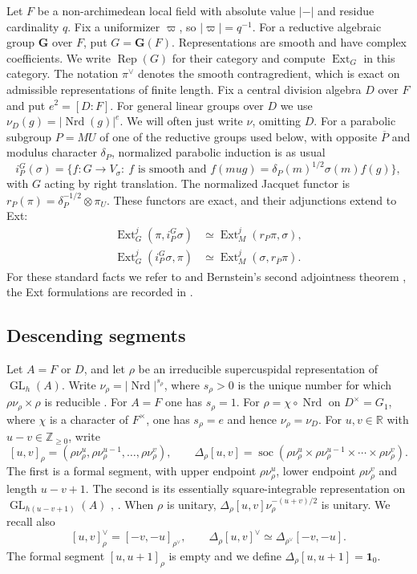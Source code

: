 \documentclass[10pt,a4paper]{article}
\theoremstyle{definition}
\theoremstyle{remark}
\numberwithin{equation}{section}
\newcommand{\ZZ}{\mathbb{Z}}
\newcommand{\rep}{\operatorname{Rep}}
\newcommand{\one}{\mathbf{1}}
\DeclareMathOperator{\Ext}{Ext}
\DeclareMathOperator{\GL}{GL}
\newcommand{\De}{\Delta}
\DeclareMathOperator{\soc}{soc}
\begin{document}
Let $F$ be a non-archimedean local field
with absolute value $|-|$ and residue cardinality $q$. Fix a
uniformizer $\varpi$, so $|\varpi|=q^{-1}$.
For a reductive algebraic group $\mathbf G$ over $F$, put
$G=\mathbf G(F)$. Representations are smooth and have complex
coefficients. We write $\rep(G)$ for their category and compute
$\Ext_G$ in this category. The notation $\pi^\vee$ denotes the smooth
contragredient, which is exact on admissible representations of finite
length.
Fix a central division algebra $D$ over $F$ and put $e^2=[D:F]$.
For general linear groups over $D$ we use
$\nu_D(g)=|\operatorname{Nrd}(g)|^e$.
We will often just write $\nu$, omitting $D$.
For a parabolic subgroup $P=MU$ of one of the reductive groups used
below, with opposite $\overline P$ and modulus character $\delta_P$,
normalized parabolic induction is as usual
\[
 i_P^G(\sigma)
 =\{f:G\longrightarrow V_\sigma:\ f\text{ is smooth and }
 f(mug)=\delta_P(m)^{1/2}\sigma(m)f(g)\},
\]
with $G$ acting by right translation. The normalized Jacquet functor
is $r_P(\pi)=\delta_P^{-1/2}\otimes\pi_U$. These functors are exact,
and their adjunctions extend to Ext:
\begin{align*}
 \Ext_G^j(\pi,i_P^G\sigma)&\simeq\Ext_M^j(r_P\pi,\sigma),\\
 \Ext_G^j(i_P^G\sigma,\pi)&\simeq
       \Ext_M^j(\sigma,r_{\overline P}\pi).
\end{align*}
For these standard facts we refer to \cite{BZ1977} and Bernstein's
second adjointness theorem \cite{Bernstein1987}, the Ext formulations
are recorded in \cite[Lemma~3.2]{APS2017}.

\subsection{Descending segments}\label{prelim:segments}

Let $A=F$ or $D$, and let $\rho$ be an irreducible supercuspidal
representation of $\GL_h(A)$. Write
$\nu_\rho=|\operatorname{Nrd}|^{s_\rho}$, where $s_\rho>0$ is the
unique number for which $\rho\nu_\rho\times\rho$ is reducible
\cite[\S3.1]{RegularLM2018}. For $A=F$ one has $s_\rho=1$.
For $\rho=\chi\circ\operatorname{Nrd}$ on $D^\times=G_1$, where
$\chi$ is a character of $F^\times$, one has
$s_\rho=e$ and hence $\nu_\rho=\nu_D$.
For $u,v\in\mathbb{R}$ with
$u-v\in\ZZ_{\geq0}$, write
\[
 [u,v]_\rho=(\rho\nu_\rho^u,\rho\nu_\rho^{u-1},\ldots,\rho\nu_\rho^v),\qquad
 \De_\rho[u,v]=
   \soc(\rho\nu_\rho^u\times\rho\nu_\rho^{u-1}\times\cdots\times\rho\nu_\rho^v).
\]
The first is a formal segment, with upper endpoint $\rho\nu_\rho^u$,
lower endpoint $\rho\nu_\rho^v$ and length $u-v+1$. The second is its
essentially square-integrable representation on $\GL_{h(u-v+1)}(A)$
\cite[\S9]{Zelevinsky1980}, \cite[\S3.1]{RegularLM2018}.
When $\rho$ is unitary,
$\De_\rho[u,v]\nu_\rho^{-(u+v)/2}$ is unitary.
We recall also
\[
 [u,v]_\rho^\vee=[-v,-u]_{\rho^\vee},\qquad
 \De_\rho[u,v]^\vee\simeq\De_{\rho^\vee}[-v,-u].
\]
The formal segment $[u,u+1]_\rho$ is empty and we define
$\De_\rho[u,u+1]=\one_0$.
\end{document}
